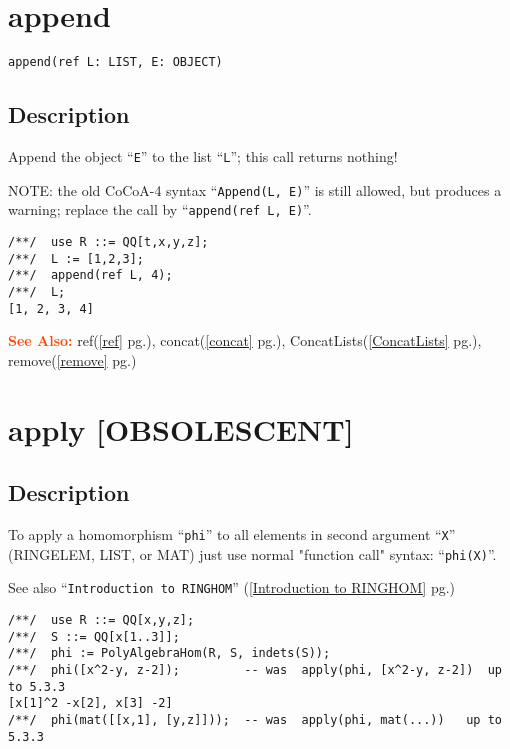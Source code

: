 \documentclass[a4paper]{mybook}
\newenvironment{command}{}{} %
\newcommand\SeeAlso{\par\textcolor{OrangeRed}{\textbf{\large See Also: }}}
\begin{document}
\section{append}
\label{append}
\begin{command} %


\begin{Verbatim}[label=syntax, rulecolor=\color{MidnightBlue},
frame=single]
append(ref L: LIST, E: OBJECT)
\end{Verbatim}


\subsection*{Description}

Append the object ``\verb&E&'' to the list ``\verb&L&''; this call returns nothing!
\par 
NOTE: the old CoCoA-4 syntax ``\verb&Append(L, E)&'' is still allowed, but
produces a warning; replace the call by ``\verb&append(ref L, E)&''.
\begin{Verbatim}[label=example, rulecolor=\color{PineGreen}, frame=single]
/**/  use R ::= QQ[t,x,y,z];
/**/  L := [1,2,3];
/**/  append(ref L, 4);
/**/  L;
[1, 2, 3, 4]
\end{Verbatim}


\SeeAlso %
  ref(\ref{ref} pg.\pageref{ref}), 
    concat(\ref{concat} pg.\pageref{concat}), 
    ConcatLists(\ref{ConcatLists} pg.\pageref{ConcatLists}), 
    remove(\ref{remove} pg.\pageref{remove})
\end{command} %

\section{apply [OBSOLESCENT]}
\label{apply [OBSOLESCENT]}
\begin{command} %



\subsection*{Description}

To apply a homomorphism ``\verb&phi&'' to all elements in second argument ``\verb&X&''
(RINGELEM, LIST, or MAT)
just use normal "function call" syntax: ``\verb&phi(X)&''.
\par 
See also ``\verb&Introduction to RINGHOM&'' (\ref{Introduction to RINGHOM} pg.\pageref{Introduction to RINGHOM})
\begin{Verbatim}[label=example, rulecolor=\color{PineGreen}, frame=single]
/**/  use R ::= QQ[x,y,z];
/**/  S ::= QQ[x[1..3]];
/**/  phi := PolyAlgebraHom(R, S, indets(S));
/**/  phi([x^2-y, z-2]);         -- was  apply(phi, [x^2-y, z-2])  up to 5.3.3
[x[1]^2 -x[2], x[3] -2]
/**/  phi(mat([[x,1], [y,z]]));  -- was  apply(phi, mat(...))   up to 5.3.3
\end{Verbatim}


\end{command} %
\end{document}
